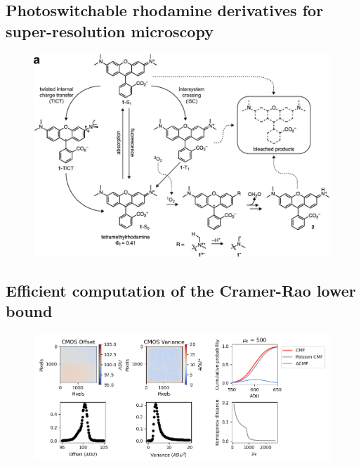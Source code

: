 \documentclass{ucetd}
\begin{document}
\subsection{Photoswitchable rhodamine derivatives for super-resolution microscopy}


\begin{figure}
\begin{center}
\includegraphics[width=14cm]{Rhodamines.png}
\end{center}
\end{figure}




\subsection{Efficient computation of the Cramer-Rao lower bound}


\begin{figure}
\begin{center}
\includegraphics[width=16cm]{Noise.png}
\end{center}
\end{figure}
\end{document}
